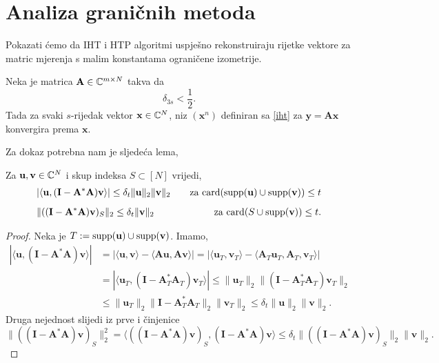 \documentclass[a4paper,twoside,12pt]{memoir} %
\newcommand{\vect}[1]{\mathbf{#1}}
\renewcommand{\vec}{\vect}
\newcommand{\card}{\text{\normalfont{card}}}
\newcommand{\supp}{\text{\normalfont{supp}}}
\newcommand{\norm}[1]{\|{#1}\|}
\begin{document}
\section[Analiza grani\v{c}nih metoda][Analiza grani\v{c}nih metoda]{Analiza grani\v{c}nih metoda}
Pokazati \'cemo da IHT i HTP algoritmi uspje\v{s}no rekonstruiraju rijetke vektore za matric mjerenja s malim konstantama ograni\v{c}ene izometrije.
\begin{thm} \label{tm:6:15}
    Neka je matrica $\vec A \in \C^{m \times N}$ takva da 
    \begin{equation}\label{6:24}
        \delta_{3s} < \frac{1}{2}. 
    \end{equation}
    Tada za svaki $s$-rijedak vektor $\vec x \in \C^N$, niz $(\vec x^n)$ definiran sa \eqref{iht} za $\vec y = \vec {Ax}$ konvergira prema $\vec x$.
\end{thm}
Za dokaz potrebna nam je sljede\'ca lema,
\begin{lem}\label{lem:6:16}
    Za $\vec u, \vec v \in \C^N$ i skup indeksa $S \subset [N]$ vrijedi,
    \begin{align*}
        &|\langle \vec u , (\vec I - \vec A^* \vec A)\vec v \rangle|  \leq \delta_t \norm{\vec u}_2 \norm{\vec v}_2 \quad & \text{za } \card(\supp(\vec u) \cup \supp(\vec v))\leq t\\[0.5em]
        &\norm{((\vec I - \vec A^* \vec A)\vec v)_S}_2 \leq \delta_t \norm{\vec v}_2 \quad & \text{za } \card(S \cup \supp(\vec v)) \leq t.
    \end{align*}
\end{lem}
\begin{proof}
    Neka je $T:= \supp(\vec u) \cup \supp(\vec v)$. Imamo,
    \begin{align*}
        |\langle \vec u , (\vec I - \vec A^* \vec A)\vec v \rangle| &= |\langle \vec u, \vec v \rangle - \langle \vec{Au}, \vec{Av} \rangle| = |\langle \vec u_T, \vec v_T \rangle - \langle \vec A_T \vec u_T, \vec A_T, \vec v_T \rangle|\\[0.5em]
        &=|\langle \vec u_T, (\vec I - \vec A^*_T \vec A_T)\vec v_T \rangle| \leq \norm{\vec u_T}_2 \norm{(\vec I - \vec A^*_T \vec A_T)\vec v_T}_2\\[0.5em]
        &\leq \norm{\vec u_T}_2 \norm{\vec I - \vec A^*_T \vec A_T}_2 \norm{\vec v_T}_2 \leq \delta_t \norm{\vec u}_2 \norm{\vec v}_2.
    \end{align*}
    Druga nejednost slijedi iz prve i \v{c}injenice
    \begin{equation*}
        \norm{((\vec I - \vec A^* \vec A)\vec v)_S}_2^2 = \langle ((\vec I - \vec A^* \vec A)\vec v)_S, (\vec I - \vec A^*\vec A)\vec v \rangle \leq \delta_t \norm{((\vec I - \vec A^*\vec A)\vec v)_S}_2 \norm{\vec v}_2.
    \end{equation*}
\end{proof}
\end{document}
